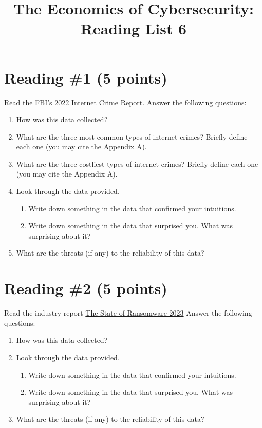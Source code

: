 \documentclass[11pt]{article}
\title{The Economics of Cybersecurity: Reading List 6}
\author{}
\begin{document}
\maketitle

\section*{Reading \#1 (5 points)}

Read the FBI's \href{https://www.ic3.gov/Media/PDF/AnnualReport/2022_IC3Report.pdf}{2022 Internet Crime Report}. 
Answer the following questions:
\begin{enumerate}
    \item How was this data collected?
    \item What are the three most common types of internet crimes? Briefly define each one (you may cite the Appendix A).
    \item What are the three costliest types of internet crimes? Briefly define each one (you may cite the Appendix A).
    \item Look through the data provided.
    \begin{enumerate}
        \item Write down something in the data that confirmed your intuitions.
        \item Write down something in the data that surprised you. What was surprising about it?
    \end{enumerate}
    \item What are the threats (if any) to the reliability of this data?
\end{enumerate}


\section*{Reading \#2 (5 points)}

Read the industry report \href{https://assets.sophos.com/X24WTUEQ/at/c949g7693gsnjh9rb9gr8/sophos-state-of-ransomware-2023-wp.pdf}{The State of Ransomware 2023}
Answer the following questions:
\begin{enumerate}
    \item How was this data collected?
    \item Look through the data provided.
    \begin{enumerate}
        \item Write down something in the data that confirmed your intuitions.
        \item Write down something in the data that surprised you. What was surprising about it?
    \end{enumerate}
    \item What are the threats (if any) to the reliability of this data?
\end{enumerate}
\end{document}
